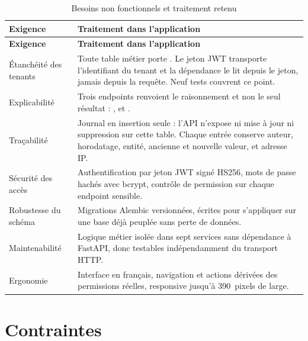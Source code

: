 \begin{longtable}{@{}L{3.4cm} L{10.8cm}@{}}
\caption{Besoins non fonctionnels et traitement retenu}
\label{tab:nfr}\\
\toprule
\textbf{Exigence} & \textbf{Traitement dans l'application} \\
\midrule
\endfirsthead
\toprule
\textbf{Exigence} & \textbf{Traitement dans l'application} \\
\midrule
\endhead
\bottomrule
\endfoot

Étanchéité des tenants
& Toute table métier porte . Le jeton JWT transporte
  l'identifiant du tenant et la dépendance  le lit depuis le
  jeton, jamais depuis la requête. Neuf tests couvrent ce point. \\

Explicabilité
& Trois endpoints renvoient le raisonnement et non le seul résultat :
  ,  et
  . \\

Traçabilité
& Journal  en insertion seule : l'API n'expose ni mise à jour ni
  suppression sur cette table. Chaque entrée conserve auteur, horodatage, entité,
  ancienne et nouvelle valeur, et adresse IP. \\

Sécurité des accès
& Authentification par jeton JWT signé HS256, mots de passe hachés avec bcrypt,
  contrôle de permission sur chaque endpoint sensible. \\

Robustesse du schéma
& Migrations Alembic versionnées, écrites pour s'appliquer sur une base déjà peuplée
  sans perte de données. \\

Maintenabilité
& Logique métier isolée dans sept services sans dépendance à FastAPI, donc testables
  indépendamment du transport HTTP. \\

Ergonomie
& Interface en français, navigation et actions dérivées des permissions réelles,
  responsive jusqu'à 390~pixels de large. \\
\end{longtable}

\section{Contraintes}


